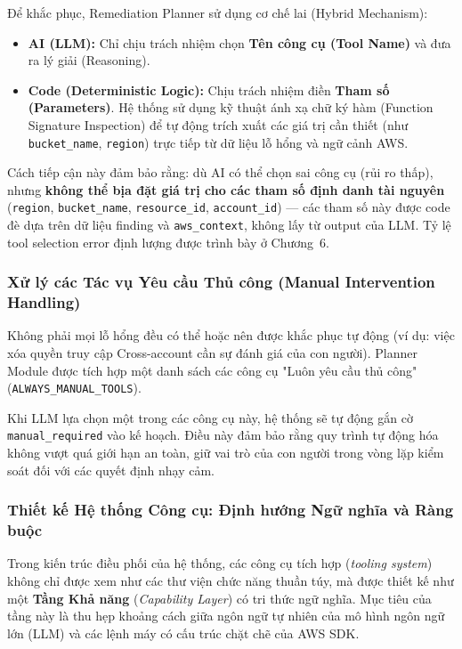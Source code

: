 Để khắc phục, Remediation Planner sử dụng cơ chế lai (Hybrid Mechanism):
\begin{itemize}
  \item \textbf{AI (LLM):} Chỉ chịu trách nhiệm chọn \textbf{Tên công cụ (Tool Name)} và đưa ra lý giải (Reasoning).
  \item \textbf{Code (Deterministic Logic):} Chịu trách nhiệm điền \textbf{Tham số (Parameters)}. Hệ thống sử dụng kỹ thuật ánh xạ chữ ký hàm (Function Signature Inspection) để tự động trích xuất các giá trị cần thiết (như \texttt{bucket\_name}, \texttt{region}) trực tiếp từ dữ liệu lỗ hổng và ngữ cảnh AWS.
\end{itemize}

Cách tiếp cận này đảm bảo rằng: dù AI có thể chọn sai công cụ (rủi ro thấp), nhưng \textbf{không thể bịa đặt giá trị cho các tham số định danh tài nguyên} (\texttt{region}, \texttt{bucket\_name}, \texttt{resource\_id}, \texttt{account\_id}) — các tham số này được code đè dựa trên dữ liệu finding và \texttt{aws\_context}, không lấy từ output của LLM. Tỷ lệ tool selection error định lượng được trình bày ở Chương~6.

\subsubsection*{Xử lý các Tác vụ Yêu cầu Thủ công (Manual Intervention Handling)}
Không phải mọi lỗ hổng đều có thể hoặc nên được khắc phục tự động (ví dụ: việc xóa quyền truy cập Cross-account cần sự đánh giá của con người). Planner Module được tích hợp một danh sách các công cụ "Luôn yêu cầu thủ công" (\texttt{ALWAYS\_MANUAL\_TOOLS}).

Khi LLM lựa chọn một trong các công cụ này, hệ thống sẽ tự động gắn cờ \texttt{manual\_required} vào kế hoạch. Điều này đảm bảo rằng quy trình tự động hóa không vượt quá giới hạn an toàn, giữ vai trò của con người trong vòng lặp kiểm soát đối với các quyết định nhạy cảm.

\subsubsection*{Thiết kế Hệ thống Công cụ: Định hướng Ngữ nghĩa và Ràng buộc}

Trong kiến trúc điều phối của hệ thống,
các công cụ tích hợp
(\textit{tooling system})
không chỉ được xem
như các thư viện chức năng thuần túy,
mà được thiết kế
như một \textbf{Tầng Khả năng}
(\textit{Capability Layer})
có tri thức ngữ nghĩa.
Mục tiêu của tầng này
là thu hẹp khoảng cách
giữa ngôn ngữ tự nhiên
của mô hình ngôn ngữ lớn (LLM)
và các lệnh máy
có cấu trúc chặt chẽ
của AWS SDK.

